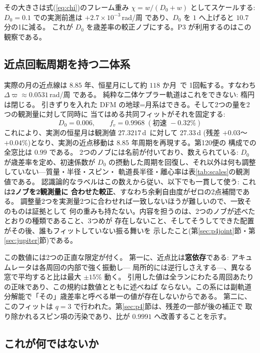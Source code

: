 \documentclass[a4paper,10pt,twocolumn]{ltjsarticle}
\begin{document}
その大きさは式(\ref{eq:chi})のフレーム重み $\chi=w/(D_0+w)$ としてスケールする:
$D_0=0.1$ での実測前進は $+2.7\times10^{-3}$\,rad/周 であり、$D_0$ を $1$ へ上げると
$10.7$ 分の1に減る。
これが $D_0$ を歳差率の較正ノブにする。P3 が利用するのはこの観察である。

\subsection{近点回転周期を持つ二体系}
\label{sec:p3fit}

実際の月の近点線は $8.85$ 年、恒星月にして約 $118$ か月~\cite{ExplSup2013,NASAFact}で
1回転する。すなわち $\Delta\varpi\approx0.0531$\,rad/周 である。
純粋な二体ケプラー軌道はこれをできない: 楕円は閉じる。
引きずりを入れた DFM の地球=月系はできる。そして2つの量を2つの観測量に対して同時に
当てはめる共同フィットがそれを固定する:
\begin{equation}
  D_0 = 0.006, \qquad
  f_{v} = 0.9968 \;(\text{初速 } -0.32\%)
  \label{eq:fit}
\end{equation}
これにより、実測の恒星月は観測値 $27.3217$\,d~\cite{NASAFact}に対して $27.33$\,d
(残差 $+0.03$〜$+0.04\%$)となり、実測の近点移動は $8.85$ 年周期を再現する。第120便の
構成での全窓比は $0.99$ である。
2つのノブには名前が付いており、数えられている: $D_0$ が歳差率を定め、初速係数が
$D_0$ の摂動した周期を回復し、それ以外は何も調整していない---質量・半径・スピン・
軌道長半径・離心率は表\ref{tab:scales}の観測値である。
認識論的なラベルはこの数えから従い、以下でも一貫して使う: これは\textbf{2ノブを2観測量に
合わせた較正}、すなわち余剰自由度がゼロの2点補間である。
調整量2つを実測量2つに合わせれば一致しないほうが難しいので、一致そのものは証拠として
何の重みも持たない。内容を担うのは、2つのノブが述べたとおりの種類であること、3つめが
存在しないこと、そしてそうしてできた配置がその後、誰もフィットしていない振る舞いを
示したこと(第\ref{sec:p4joint}節・第\ref{sec:jupiter}節)である。

この数値には2つの正直な限定が付く。
第一に、近点比は\textbf{窓依存}である: アキュムレータは各周回の内部で強く振動し---
局所的には逆行しさえする---、異なる窓で平均すると比は最大 $\pm15\%$ 動く。
引用した値は全ランにわたる周回あたりの正味であり、この規約は数値とともに述べねば
ならない。この系には副軌道分解能で「その」歳差率と呼べる単一の値が存在しないからである。
第二に、このフィットは $q=3$ で行われた。第\ref{sec:p4}節は、残差の一部が後の補正で
取り除かれるスピン項の汚染であり、比が $0.9991$ へ改善することを示す。

\subsection{これが何ではないか}
\label{sec:p3not}
\end{document}
